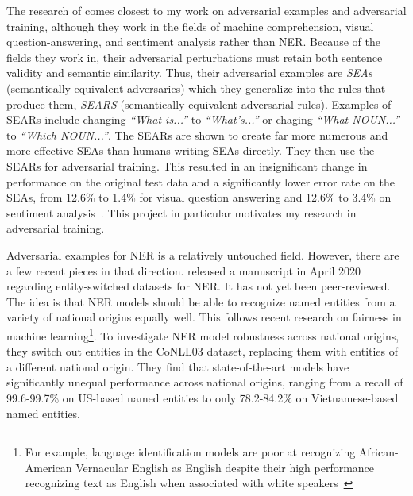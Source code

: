 The research of \cite{SEARs} comes closest to my work on adversarial examples and adversarial training, although they work in the fields of machine comprehension, visual question-answering, and sentiment analysis rather than NER. Because of the fields they work in, their adversarial perturbations must retain both sentence validity and semantic similarity. Thus, their adversarial examples are \textit{SEAs} (semantically equivalent adversaries) which they generalize into the rules that produce them, \textit{SEARS} (semantically equivalent adversarial rules). Examples of SEARs include changing \textit{``What is...''} to \textit{``What's...''} or chaging \textit{``What \textsc{NOUN}...''} to \textit{``Which \textsc{NOUN}...''}. The SEARs are shown to create far more numerous and more effective SEAs than humans writing SEAs directly. They then use the SEARs for adversarial training. This  resulted in an insignificant change in performance on the original test data and a significantly lower error rate on the SEAs, from 12.6\% to 1.4\% for visual question answering and 12.6\% to 3.4\% on sentiment analysis~\citep{SEARs}. This project in particular motivates my research in adversarial training.

Adversarial examples for NER is a relatively untouched field. However, there are a few recent pieces in that direction. \cite{entityswitched} released a manuscript in April 2020 regarding entity-switched datasets for NER. It has not yet been peer-reviewed. The idea is that NER models should be able to recognize named entities from a variety of national origins equally well. This follows recent research on fairness in machine learning\footnote{For example, language identification models are poor at recognizing African-American Vernacular English as English despite their high performance recognizing text as English when associated with white speakers~\citep{blodgett2016}}. To investigate NER model robustness across national origins, they switch out entities in the CoNLL03 dataset, replacing them with entities of a different national origin. They find that state-of-the-art models have significantly unequal performance across national origins, ranging from a recall of 99.6-99.7\% on US-based named entities to only 78.2-84.2\% on Vietnamese-based named entities. 

